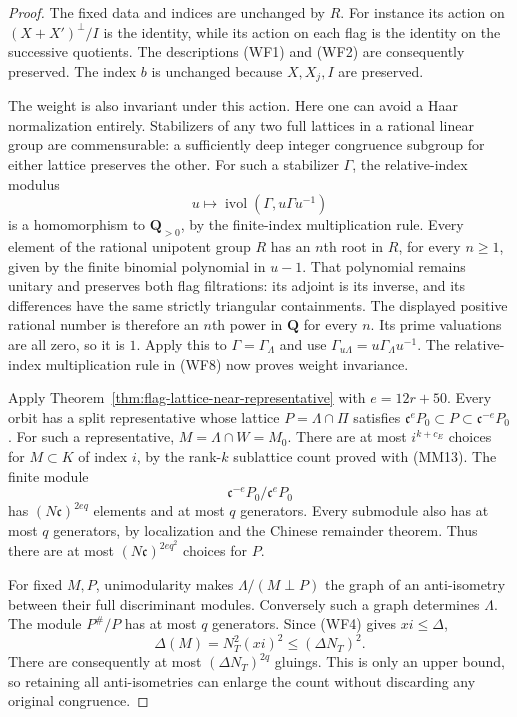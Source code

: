 \begin{proof}
The fixed data and indices are unchanged by $R$.
For instance its action on $(X+X')^\perp/I$ is the
identity, while its action on each flag is the identity
on the successive quotients.  The descriptions (WF1)
and (WF2) are consequently preserved.  The index $b$
is unchanged because $X,X_j,I$ are preserved.

The weight is also invariant under this action.  Here
one can avoid a Haar normalization entirely.  Stabilizers
of any two full lattices in a rational linear group are
commensurable: a sufficiently deep integer congruence
subgroup for either lattice preserves the other.
For such a stabilizer $\Gamma$, the relative-index
modulus
\[
       u\longmapsto
          \operatorname{ivol}(\Gamma,u\Gamma u^{-1})
\]
is a homomorphism to $\mathbf Q_{>0}$, by the finite-index
multiplication rule.  Every element of the rational
unipotent group $R$ has an $n$th root in $R$, for every
$n\geq1$, given by the finite binomial polynomial in
$u-1$.  That polynomial remains unitary and preserves
both flag filtrations: its adjoint is its inverse,
and its differences have the same strictly triangular
containments.  The displayed positive rational number
is therefore an $n$th power in $\mathbf Q$ for every
$n$.  Its prime valuations are all zero, so it is $1$.
Apply this to $\Gamma=\Gamma_\Lambda$ and use
$\Gamma_{u\Lambda}=u\Gamma_\Lambda u^{-1}$.
The relative-index multiplication rule in (WF8)
now proves weight invariance.

Apply Theorem~\ref{thm:flag-lattice-near-representative}
with $e=12r+50$.  Every orbit has a split representative
whose lattice $P=\Lambda\cap\Pi$ satisfies
$\mathfrak c^eP_0\subset P\subset\mathfrak c^{-e}P_0$.
For such a representative, $M=\Lambda\cap W=M_0$.
There are at most $i^{k+c_E}$ choices for $M\subset K$
of index $i$, by the rank-$k$ sublattice count proved
with (MM13).  The finite module
\[
                     \mathfrak c^{-e}P_0/\mathfrak c^eP_0
\]
has $(N\mathfrak c)^{2eq}$ elements and at most $q$
generators.  Every submodule also has at most $q$
generators, by localization and the Chinese remainder
theorem.  Thus there are at most
$(N\mathfrak c)^{2eq^2}$ choices for $P$.

For fixed $M,P$, unimodularity makes $\Lambda/(M\perp P)$
the graph of an anti-isometry between their full
discriminant modules.  Conversely such a graph determines
$\Lambda$.  The module $P^\#/P$ has at most $q$
generators.  Since (WF4) gives $xi\leq\Delta$,
\[
                   \Delta(M)=N_T^2(xi)^2
                              \leq(\Delta N_T)^2.
\]
There are consequently at most
$(\Delta N_T)^{2q}$ gluings.  This is only an upper
bound, so retaining all anti-isometries can enlarge
the count without discarding any original congruence.


\end{proof}
